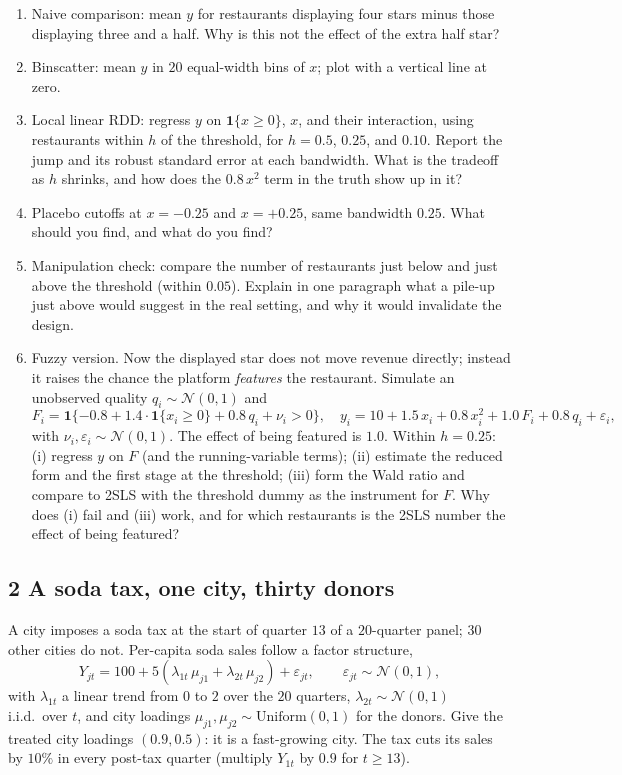 \documentclass[11pt]{article}
\begin{document}
\begin{enumerate}[label=(\alph*)]
\item Naive comparison: mean $y$ for restaurants displaying four stars minus those displaying three and
a half. Why is this not the effect of the extra half star?
\item Binscatter: mean $y$ in $20$ equal-width bins of $x$; plot with a vertical line at zero.
\item Local linear RDD: regress $y$ on $\mathbf{1}\{x \ge 0\}$, $x$, and their interaction, using
restaurants within $h$ of the threshold, for $h = 0.5$, $0.25$, and $0.10$. Report the jump and its
robust standard error at each bandwidth. What is the tradeoff as $h$ shrinks, and how does the
$0.8\,x^{2}$ term in the truth show up in it?
\item Placebo cutoffs at $x = -0.25$ and $x = +0.25$, same bandwidth $0.25$. What should you find,
and what do you find?
\item Manipulation check: compare the number of restaurants just below and just above the threshold
(within $0.05$). Explain in one paragraph what a pile-up just above would suggest in the real
setting, and why it would invalidate the design.
\item Fuzzy version. Now the displayed star does not move revenue directly; instead it raises the
chance the platform \emph{features} the restaurant. Simulate an unobserved quality $q_{i} \sim
\mathcal{N}(0,1)$ and
\[
F_{i} = \mathbf{1}\{-0.8 + 1.4\cdot\mathbf{1}\{x_{i} \ge 0\} + 0.8\,q_{i} + \nu_{i} > 0\},\quad
y_{i} = 10 + 1.5\,x_{i} + 0.8\,x_{i}^{2} + 1.0\,F_{i} + 0.8\,q_{i} + \varepsilon_{i},
\]
with $\nu_{i}, \varepsilon_{i} \sim \mathcal{N}(0,1)$. The effect of being featured is $1.0$.
Within $h = 0.25$: (i) regress $y$ on $F$ (and the running-variable terms); (ii) estimate the
reduced form and the first stage at the threshold; (iii) form the Wald ratio and compare to 2SLS
with the threshold dummy as the instrument for $F$. Why does (i) fail and (iii) work, and for
which restaurants is the 2SLS number the effect of being featured?
\end{enumerate}

\subsection*{2 A soda tax, one city, thirty donors}

A city imposes a soda tax at the start of quarter $13$ of a $20$-quarter panel; $30$ other cities do
not. Per-capita soda sales follow a factor structure,
\[
Y_{jt} = 100 + 5\left(\lambda_{1t}\,\mu_{j1} + \lambda_{2t}\,\mu_{j2}\right) + \varepsilon_{jt},
\qquad \varepsilon_{jt} \sim \mathcal{N}(0,1),
\]
with $\lambda_{1t}$ a linear trend from $0$ to $2$ over the $20$ quarters, $\lambda_{2t} \sim \mathcal{N}(0,1)$
i.i.d.\ over $t$, and city loadings $\mu_{j1}, \mu_{j2} \sim \text{Uniform}(0,1)$ for the donors. Give the
treated city loadings $(0.9, 0.5)$: it is a fast-growing city. The tax cuts its sales by
$10\%$ in every post-tax quarter (multiply $Y_{1t}$ by $0.9$ for $t \ge 13$).
\end{document}
